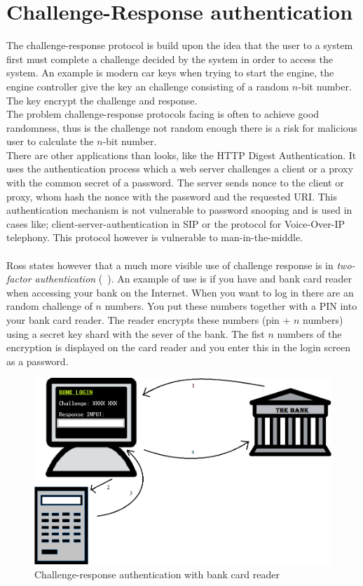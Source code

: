 \section{Challenge-Response authentication}\label{sec:challResp} 
The challenge-response protocol is build upon the idea that the user to a system first must complete a challenge decided by the system in order to access the system. An example is modern car keys when trying to start the engine, the engine controller give the key an challenge consisting of a random $n$-bit number. The key encrypt the challenge and response. \\
The problem challenge-response protocols facing is often to achieve good randomness, thus is the challenge not random enough there is a risk for malicious user to calculate the $n$-bit number. \\
There are other applications than looks, like the HTTP Digest Authentication. It uses the authentication process  which a web server challenges a client or a proxy with the common secret of a password. The server sends nonce to the client or proxy, whom hash the nonce with the password and the requested URI. This authentication mechanism is not vulnerable to password snooping and is used in cases like; client-server-authentication in SIP or the protocol for Voice-Over-IP telephony. This protocol however is vulnerable to man-in-the-middle. \\
\\
Ross states however that a much more visible use of challenge response is in \textit{two-factor authentication} (~). An example of use is if you have and bank card reader when accessing your bank on the Internet. When you want to log in there are an random challenge of $n$ numbers. You put these numbers together with a PIN into your bank card reader. The reader encrypts these numbers (pin + $n$ numbers) using a secret key shard with the sever of the bank. The fist $n$ numbers of the encryption is displayed on the card reader and you enter this in the login screen as a password. 
\begin{figure}[H]
	\centering
    \includegraphics[scale=0.3]{img/challenge-response-bank}
    \caption{Challenge-response authentication with bank card reader}
  \label{fig:challengeResponse}
\end{figure}
